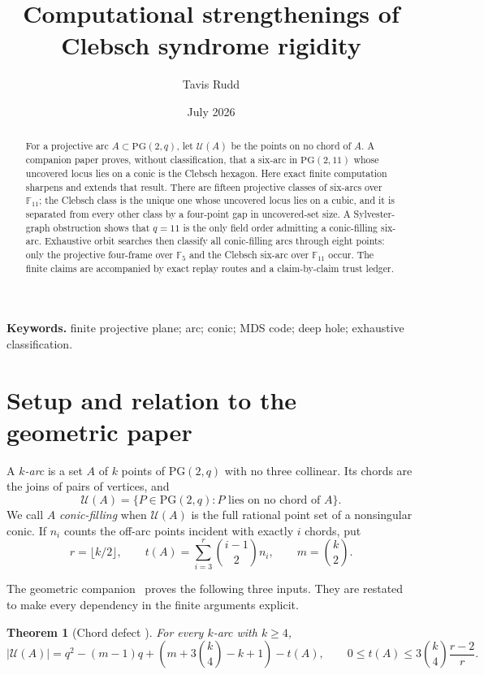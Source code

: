 \documentclass[11pt]{article}
\title{Computational strengthenings of Clebsch syndrome rigidity}
\author{Tavis Rudd}
\date{July 2026}
\newtheorem{theorem}{Theorem}[section]
\theoremstyle{remark}
\newcommand{\PG}{\mathrm{PG}}
\newcommand{\F}{\mathbb{F}}
\newcommand{\cU}{\mathcal{U}}
\begin{document}
\maketitle

\begin{abstract}
For a projective arc $A\subset\PG(2,q)$, let $\cU(A)$ be the points on no
chord of $A$.  A companion paper proves, without classification, that a
six-arc in $\PG(2,11)$ whose uncovered locus lies on a conic is the Clebsch
hexagon.  Here exact finite computation sharpens and extends that result.
There are fifteen projective classes of six-arcs over $\F_{11}$; the
Clebsch class is the unique one whose uncovered locus lies on a cubic, and
it is separated from every other class by a four-point gap in uncovered-set
size.  A Sylvester-graph obstruction shows that $q=11$ is the only field
order admitting a conic-filling six-arc.  Exhaustive orbit searches then
classify all conic-filling arcs through eight points: only the projective
four-frame over $\F_5$ and the Clebsch six-arc over $\F_{11}$ occur.
The finite claims are accompanied by exact replay routes and a
claim-by-claim trust ledger.
\end{abstract}

\noindent\textbf{Keywords.} finite projective plane; arc; conic; MDS code;
deep hole; exhaustive classification.

\section{Setup and relation to the geometric paper}

A \emph{$k$-arc} is a set $A$ of $k$ points of $\PG(2,q)$ with no three
collinear.  Its chords are the joins of pairs of vertices, and
\[
 \cU(A)=\{P\in\PG(2,q): P\text{ lies on no chord of }A\}.
\]
We call $A$ \emph{conic-filling} when $\cU(A)$ is the full rational point
set of a nonsingular conic.  If $n_i$ counts the off-arc points incident
with exactly $i$ chords, put
\[
 r=\lfloor k/2\rfloor,\qquad
 t(A)=\sum_{i=3}^{r}\binom{i-1}{2}n_i,\qquad
 m=\binom{k}{2}.
\]

The geometric companion~\cite{RuddRigidity2026} proves the following three
inputs.  They are restated to make every dependency in the finite arguments
explicit.

\begin{theorem}[Chord defect {\cite[Theorem 3.1]{RuddRigidity2026}}]
\label{lem:chord-defect}
For every $k$-arc with $k\ge4$,
\[
 |\cU(A)|=q^2-(m-1)q+
 \left(m+3\binom{k}{4}-k+1\right)-t(A),
\qquad
0\le t(A)\le3\binom{k}{4}\frac{r-2}{r}.
\]
\end{theorem}
\end{document}
